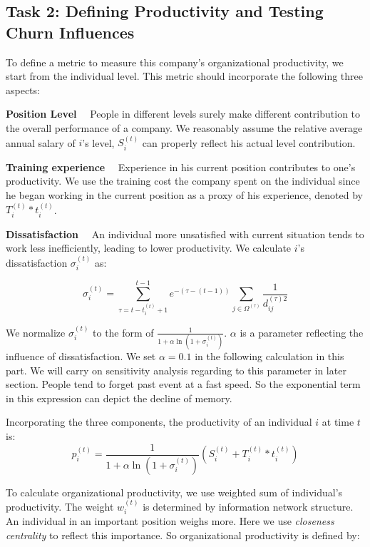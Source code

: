\documentclass[tcn = 37075, sheet = false, abstract = false]{mcmthesis}
\begin{document}
	\subsection{Task 2: Defining Productivity and Testing Churn Influences}
	
	To define a metric to measure this company's organizational productivity, we start from the individual level. This metric should incorporate the following three aspects:
	
	\noindent \textbf{Position Level} \ \ People in different levels surely make different contribution to the overall performance of a company. We reasonably assume the relative average annual salary of $i$'s level, $S_i^{(t)}$ can properly reflect his actual level contribution.
	
	
	\noindent \textbf{Training experience} \ \ Experience in his current position contributes to one's productivity. We use the training cost the company spent on the individual since he began working in the current position as a proxy of his experience, denoted by $T_i^{(t)}*t_i^{(t)}$.
	
	
	\noindent \textbf{Dissatisfaction} \ \ An individual more unsatisfied with current situation tends to work less inefficiently, leading to lower productivity. We calculate $i$'s dissatisfaction $\sigma_i^{(t)}$ as:
	
	$$\displaystyle \sigma_i^{(t)}=\sum_{\tau=t-t_i^{(t)}+1}^{t-1}e^{-(\tau-(t-1))}\sum_{j\in \Omega^{(\tau)}}\frac{1}{d_{ij}^{(\tau)2}}$$
	
	We normalize $\sigma_i^{(t)}$ to the form of $\frac{1}{1+\alpha\ln{(1+\sigma_i^{(t)})}}$. $\alpha$ is a parameter reflecting the influence of dissatisfaction. We set $\displaystyle \alpha = 0.1$ in the following calculation in this part. We will carry on sensitivity analysis regarding to this parameter in later section. People tend to forget past event at a fast speed\cite{ebbighaus1913memory}. So the exponential term in this expression can depict the decline of memory.
	
	Incorporating the three components, the productivity of an individual $i$ at time $t$ is:
	$$ p_i^{(t)}=\frac{1}{1+\alpha\ln{(1+\sigma_i^{(t)})}}(S_i^{(t)}+T_i^{(t)}*t_i^{(t)})$$
	
	To calculate organizational productivity, we use weighted sum of individual's productivity. The weight $w_i^{(t)}$ is determined by information network structure. An individual in an important position weighs more. Here we use \textit{closeness centrality} to reflect this importance. So organizational productivity is defined by:
	
\end{document}
